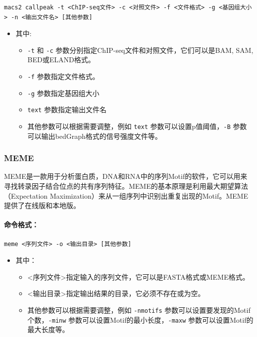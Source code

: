 \documentclass[UTF8]{ctexart}
\begin{document}
\begin{lstlisting}
macs2 callpeak -t <ChIP-seq文件> -c <对照文件> -f <文件格式> -g <基因组大小> -n <输出文件名> [其他参数]
\end{lstlisting}

\begin{itemize}
	\item 其中:
	\begin{itemize}
		\item \verb|-t| 和 \verb|-c| 参数分别指定ChIP-seq文件和对照文件，它们可以是BAM, SAM, BED或ELAND格式。
		\item \verb|-f| 参数指定文件格式。
		\item \verb|-g| 参数指定基因组大小
		\item \verb|text| 参数指定输出文件名
		\item 其他参数可以根据需要调整，例如 \verb|text| 参数可以设置p值阈值，\verb|-B| 参数可以输出bedGraph格式的信号强度文件等。
	\end{itemize}
\end{itemize}

\subsubsection{MEME}

MEME是一款用于分析蛋白质，DNA和RNA中的序列Motif的软件，它可以用来寻找转录因子结合位点的共有序列特征。MEME的基本原理是利用最大期望算法（Expectation Maximization）来从一组序列中识别出重复出现的Motif。MEME提供了在线版和本地版。

\paragraph*{命令格式：}
\begin{lstlisting}
meme <序列文件> -o <输出目录> [其他参数]	
\end{lstlisting}

\begin{itemize}
	\item 其中：
	\begin{itemize}
		\item <序列文件>指定输入的序列文件，它可以是FASTA格式或MEME格式。
		\item <输出目录>指定输出结果的目录，它必须不存在或为空。
		\item 其他参数可以根据需要调整，例如 \verb|-nmotifs| 参数可以设置要发现的Motif个数，\verb|-minw| 参数可以设置Motif的最小长度，\verb|-maxw| 参数可以设置Motif的最大长度等。
	\end{itemize}
\end{itemize}
\end{document}
